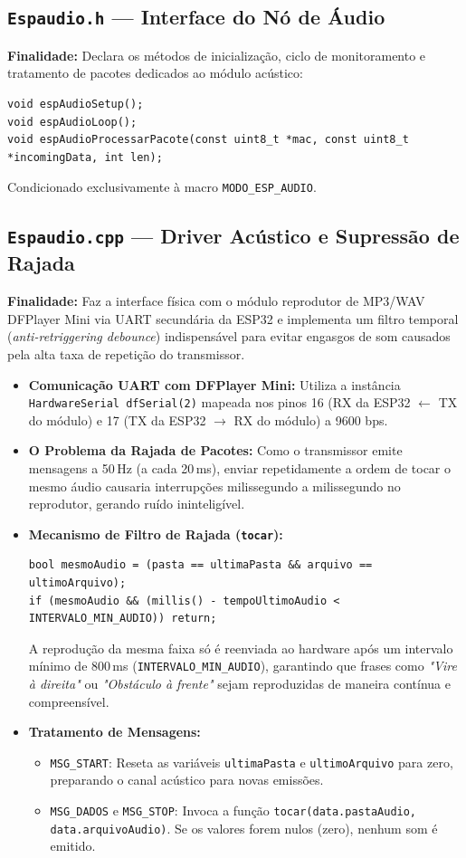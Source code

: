 \documentclass[12pt,a4paper]{article}
\begin{document}
\subsection{\texttt{Espaudio.h} --- Interface do Nó de Áudio}
\textbf{Finalidade:} Declara os métodos de inicialização, ciclo de monitoramento e tratamento de pacotes dedicados ao módulo acústico:
\begin{lstlisting}
void espAudioSetup();
void espAudioLoop();
void espAudioProcessarPacote(const uint8_t *mac, const uint8_t *incomingData, int len);
\end{lstlisting}
Condicionado exclusivamente à macro \texttt{MODO\_ESP\_AUDIO}.

\subsection{\texttt{Espaudio.cpp} --- Driver Acústico e Supressão de Rajada}
\textbf{Finalidade:} Faz a interface física com o módulo reprodutor de MP3/WAV DFPlayer Mini via UART secundária da ESP32 e implementa um filtro temporal (\textit{anti-retriggering debounce}) indispensável para evitar engasgos de som causados pela alta taxa de repetição do transmissor.

\begin{itemize}
    \item \textbf{Comunicação UART com DFPlayer Mini:} Utiliza a instância \texttt{HardwareSerial dfSerial(2)} mapeada nos pinos 16 (RX da ESP32 $\leftarrow$ TX do módulo) e 17 (TX da ESP32 $\rightarrow$ RX do módulo) a 9600 bps.
    \item \textbf{O Problema da Rajada de Pacotes:} Como o transmissor emite mensagens a 50\,Hz (a cada 20\,ms), enviar repetidamente a ordem de tocar o mesmo áudio causaria interrupções milissegundo a milissegundo no reprodutor, gerando ruído ininteligível.
    \item \textbf{Mecanismo de Filtro de Rajada (\texttt{tocar}):}
    \begin{lstlisting}
bool mesmoAudio = (pasta == ultimaPasta && arquivo == ultimoArquivo);
if (mesmoAudio && (millis() - tempoUltimoAudio < INTERVALO_MIN_AUDIO)) return;
    \end{lstlisting}
    A reprodução da mesma faixa só é reenviada ao hardware após um intervalo mínimo de 800\,ms (\texttt{INTERVALO\_MIN\_AUDIO}), garantindo que frases como \textit{"Vire à direita"} ou \textit{"Obstáculo à frente"} sejam reproduzidas de maneira contínua e compreensível.
    \item \textbf{Tratamento de Mensagens:}
    \begin{itemize}
        \item \texttt{MSG\_START}: Reseta as variáveis \texttt{ultimaPasta} e \texttt{ultimoArquivo} para zero, preparando o canal acústico para novas emissões.
        \item \texttt{MSG\_DADOS} e \texttt{MSG\_STOP}: Invoca a função \texttt{tocar(data.pastaAudio, data.arquivoAudio)}. Se os valores forem nulos (zero), nenhum som é emitido.
    \end{itemize}
\end{itemize}
\end{document}
